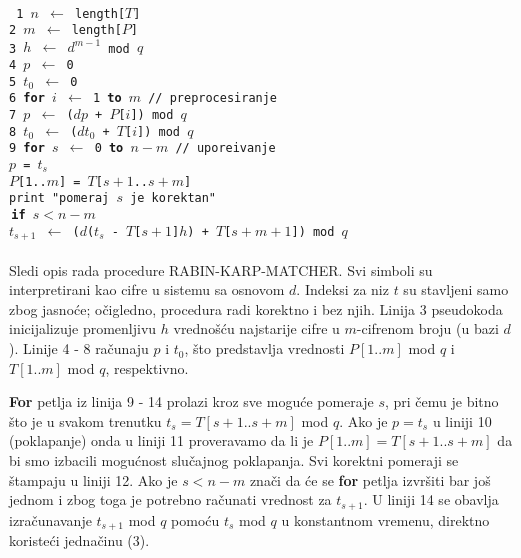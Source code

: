 \documentclass[a4paper,12pt]{article}
\newcommand{\razmak}{\vspace{0.2cm}}
\begin{document}
 \\
\texttt{
\noindent \phantom{1}1 $n$ $\leftarrow$ length[$T$] \\
\noindent \phantom{1}2 $m$ $\leftarrow$ length[$P$] \\
\noindent \phantom{1}3 $h$ $\leftarrow$ $d^{m - 1}$ mod $q$ \\
\noindent \phantom{1}4 $p$ $\leftarrow$ 0 \\
\razmak
\noindent \phantom{1}5 $t_0$ $\leftarrow$ 0 \\
\noindent \phantom{1}6 {\bf for} $i$ $\leftarrow$ 1 {\bf to} $m$ \qquad \qquad \qquad \quad // preprocesiranje \\
\noindent \phantom{1}7  $p$ $\leftarrow$ ($dp$ + $P$[$i$]) mod $q$ \\
\razmak
\noindent \phantom{1}8 \indent \indent $t_0$ $\leftarrow$ ($dt_0$ + $T$[$i$]) mod $q$ \\
\noindent \phantom{1}9 {\bf for} $s$ $\leftarrow$ 0 {\bf to} $n - m$ \qquad \qquad \quad // upore\dj ivanje \\
  $p$ = $t_s$ \\
 \indent \indent {} $P$[1..$m$] = $T$[$s + 1$..$s + m$] \\
 \indent \indent \indent \indent \indent {} print "pomeraj $s$ je korektan" \\
 \indent \indent $\,${\bf if} $s < n - m$ \\
 \indent \indent {} $t_{s + 1}$ $\leftarrow$ ($d$($t_s$ - $T$[$s + 1$]$h$) + $T$[$s + m + 1$]) mod $q$ \\
}
\\

Sledi opis rada procedure RABIN-KARP-MATCHER. Svi simboli su interpretirani kao cifre u sistemu sa osnovom $d$. Indeksi za niz $t$ su stavljeni samo zbog jasno\' ce; o\v cigledno, procedura radi korektno i bez njih. Linija 3 pseudokoda inicijalizuje promenljivu $h$ vredno\v s\' cu najstarije cifre u $m$-cifrenom broju (u bazi $d$). Linije 4 - 8 ra\v cunaju $p$ i $t_0$, \v sto predstavlja vrednosti $P[1..m]$ mod $q$ i $T[1..m]$ mod $q$, respektivno.

{\bf For} petlja iz linija 9 - 14 prolazi kroz sve mogu\' ce pomeraje $s$, pri \v cemu je bitno \v sto je u svakom trenutku $t_s = T[s + 1..s + m]$ mod $q$. Ako je $p = t_s$ u liniji 10 (poklapanje) onda u liniji 11 proveravamo da li je $P[1..m] = T[s + 1..s + m]$ da bi smo izbacili mogu\' cnost slu\v cajnog poklapanja. Svi korektni pomeraji se \v stampaju u liniji 12. Ako je $s < n - m$ zna\v ci da \' ce se {\bf for} petlja izvr\v siti bar jo\v s jednom i zbog toga je potrebno ra\v cunati vrednost za $t_{s + 1}$. U liniji 14 se obavlja izra\v cunavanje $t_{s + 1}$ mod $q$ pomo\' cu $t_{s}$ mod $q$ u konstantnom vremenu, direktno koriste\' ci jedna\v cinu (3).
\\
\end{document}
